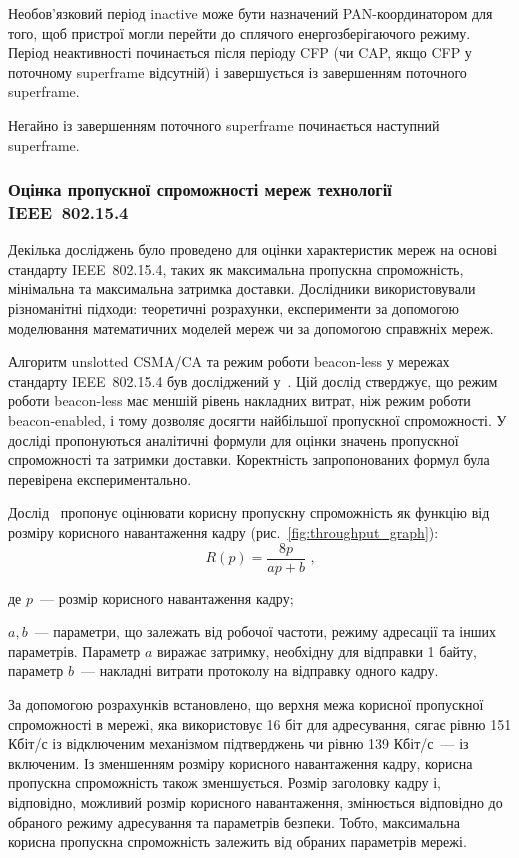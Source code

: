 \documentclass[a4paper,ukrainian,utf8,nocolumnsxix,nocolumnxxxii,nocolumnxxxi,floatsection,equationsection]{eskdtext}
\renewcommand\paragraph{\subsubsection}
\newcommand{\figref}[1]{рис.~\ref{#1}}
\newcommand{\iee}[0]{IEEE~802.15.4\xspace}
\newcommand{\csma}[0]{CSMA/CA\xspace}
\newcommand{\ucsma}[0]{unslotted \csma{}\xspace}
\newcommand{\blm}[0]{beacon-less\xspace}
\newcommand{\bem}[0]{beacon-enabled\xspace}
\begin{document}
Необов'язковий період inactive може бути назначений PAN-координатором для того, щоб пристрої могли перейти до сплячого енергозберігаючого режиму. Період неактивності починається після періоду CFP (чи CAP, якщо CFP у поточному superframe відсутній) і завершується із завершенням поточного superframe.

Негайно із завершенням поточного superframe починається наступний superframe. 

\paragraph{Оцінка пропускної спроможності мереж технології \iee}
\label{par:throughput:evaluation}

Декілька досліджень було проведено для оцінки характеристик мереж на основі стандарту \iee, таких як максимальна пропускна спроможність, мінімальна та максимальна затримка доставки. Дослідники використовували різноманітні підходи: теоретичні розрахунки, експерименти за допомогою моделювання математичних моделей мереж чи за допомогою справжніх мереж.

Алгоритм \ucsma та режим роботи \blm у мережах стандарту \iee був досліджений у~\cite{thoroughput:analysis:unslotted:ieee}. Цій дослід стверджує, що режим роботи \blm має меншій рівень накладних витрат, ніж режим роботи \bem, і тому дозволяє досягти найбільшої пропускної спроможності. У досліді пропонуються аналітичні формули для оцінки значень пропускної спроможності та затримки доставки. Коректність запропонованих формул була перевірена експериментально.

Дослід~\cite{thoroughput:analysis:unslotted:ieee} пропонує оцінювати корисну пропускну спроможність як функцію від розміру корисного навантаження кадру (\figref{fig:throughput_graph}):
\begin{equation}\label{eq:throughput}
	R(p) = \frac{8p}{ap + b} \text{ ,}
\end{equation}

де $p$~--- розмір корисного навантаження кадру;

$a,b$~--- параметри, що залежать від робочої частоти, режиму адресації та інших параметрів. Параметр $a$ виражає затримку, необхідну для відправки 1 байту, параметр $b$~--- накладні витрати протоколу на відправку одного кадру.

За допомогою розрахунків встановлено, що верхня межа корисної пропускної спроможності в мережі, яка використовує 16 біт для адресування, сягає рівню 151 Кбіт/с із відключеним механізмом підтверджень чи рівню 139 Кбіт/с~--- із включеним. Із зменшенням розміру корисного навантаження кадру, корисна пропускна спроможність також зменшується. Розмір заголовку кадру і, відповідно, можливий розмір корисного навантаження, змінюється відповідно до обраного режиму адресування та параметрів безпеки. Тобто, максимальна корисна пропускна спроможність залежить від обраних параметрів мережі.
\end{document}
